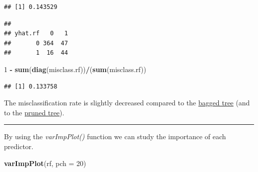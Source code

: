 \documentclass[]{article}
\newenvironment{Shaded}{\begin{snugshade}}{\end{snugshade}}
\newcommand{\DataTypeTok}[1]{\textcolor[rgb]{0.13,0.29,0.53}{#1}}
\newcommand{\DecValTok}[1]{\textcolor[rgb]{0.00,0.00,0.81}{#1}}
\newcommand{\KeywordTok}[1]{\textcolor[rgb]{0.13,0.29,0.53}{\textbf{#1}}}
\newcommand{\NormalTok}[1]{#1}
\newcommand{\OperatorTok}[1]{\textcolor[rgb]{0.81,0.36,0.00}{\textbf{#1}}}
\newcommand{\StringTok}[1]{\textcolor[rgb]{0.31,0.60,0.02}{#1}}
\begin{document}
\begin{verbatim}
## [1] 0.143529
\end{verbatim}

\begin{Shaded}
\end{Shaded}

\begin{verbatim}
##        
## yhat.rf   0   1
##       0 364  47
##       1  16  44
\end{verbatim}

\begin{Shaded}
\begin{Highlighting}[]
\DecValTok{1} \OperatorTok{-}\StringTok{ }\KeywordTok{sum}\NormalTok{(}\KeywordTok{diag}\NormalTok{(misclass.rf))}\OperatorTok{/}\NormalTok{(}\KeywordTok{sum}\NormalTok{(misclass.rf))}
\end{Highlighting}
\end{Shaded}

\begin{verbatim}
## [1] 0.133758
\end{verbatim}

\normalsize

The misclassification rate is slightly decreased compared to the
\protect\hyperlink{bagex}{bagged tree} (and to the
\protect\hyperlink{expruning}{pruned tree}).

\begin{center}\rule{0.5\linewidth}{\linethickness}\end{center}

By using the \emph{varImpPlot()} function we can study the importance of
each predictor.

\begin{Shaded}
\begin{Highlighting}[]
\KeywordTok{varImpPlot}\NormalTok{(rf, }\DataTypeTok{pch =} \DecValTok{20}\NormalTok{)}
\end{Highlighting}
\end{Shaded}
\end{document}
